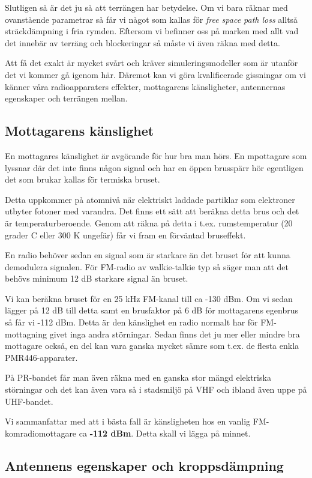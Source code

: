 \documentclass[12ypt,swedish,a4paper]{report}
\begin{document}
Slutligen så är det ju så att terrängen har betydelse. Om vi bara räknar med ovanstående parametrar så får vi något som kallas för \textit{free space path loss} alltså sträckdämpning i fria rymden. Eftersom vi befinner oss på marken med allt vad det innebär av terräng och blockeringar så måste vi även räkna med detta.

Att få det exakt är mycket svårt och kräver simuleringsmodeller som är utanför det vi kommer gå igenom här. Däremot kan vi göra kvalificerade gissningar om vi känner våra radioapparaters effekter, mottagarens känsligheter, antennernas egenskaper och terrängen mellan.

\subsection{Mottagarens känslighet}

En mottagares känslighet är avgörande för hur bra man hörs. En mpottagare som lyssnar där det inte finns någon signal och har en öppen brusspärr hör egentligen det som brukar kallas för termiska bruset.

Detta uppkommer på atomnivå när elektriskt laddade partiklar som elektroner utbyter fotoner med varandra. Det finns ett sätt att beräkna detta brus och det är temperaturberoende. Genom att räkna på detta i t.ex. rumstemperatur (20 grader C eller 300 K ungefär) får vi fram en förväntad bruseffekt.

En radio behöver sedan en signal som är starkare än det bruset för att kunna demodulera signalen. För FM-radio av walkie-talkie typ så säger man att det behövs minimum 12 dB starkare signal än bruset.

Vi kan beräkna bruset för en 25 kHz FM-kanal till ca -130 dBm. Om vi sedan lägger på 12 dB till detta samt en brusfaktor på 6 dB för mottagarens egenbrus så får vi -112 dBm. Detta är den känslighet en radio normalt har för FM-mottagning givet inga andra störningar. Sedan finns det ju mer eller mindre bra mottagare också, en del kan vara ganska mycket sämre som t.ex. de flesta enkla PMR446-apparater.

På PR-bandet får man även räkna med en ganska stor mängd elektriska störningar och det kan även vara så i stadsmiljö på VHF och ibland även uppe på UHF-bandet.

Vi sammanfattar med att i bästa fall är känsligheten hos en vanlig FM-komradiomottagare ca \textbf{-112 dBm}. Detta skall vi lägga på minnet.

\subsection{Antennens egenskaper och kroppsdämpning}
\end{document}
